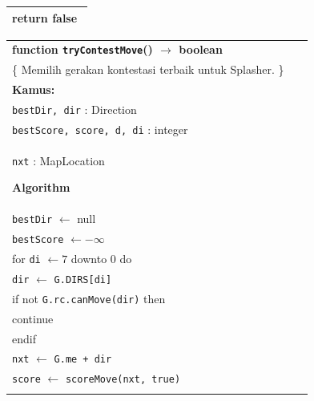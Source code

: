 \documentclass{article}
\newenvironment{pseudobox}
{
\centering
\begin{longtable}{|p{0.94\linewidth}|}
\hline
}
{
\\ \hline
\end{longtable}
\vspace{0.05cm}
}
\begin{document}
\begin{enumerate}[label=\alph*.]
\begin{enumerate}[label=\alph*.]
\begin{pseudobox}
\hspace*{1.5em}return false
\end{pseudobox}

\begin{pseudobox}
\textbf{function \texttt{tryContestMove}() $\rightarrow$ boolean} \\
\{ Memilih gerakan kontestasi terbaik untuk Splasher. \}\\

\textbf{Kamus:} \\
\hspace*{1.5em}\texttt{bestDir, dir} : Direction \\
\hspace*{1.5em}\texttt{bestScore, score, d, di} : integer \\
\hspace*{1.5em}\texttt{nxt} : MapLocation

\textbf{Algorithm} \\
\hspace*{1.5em}\texttt{bestDir} $\leftarrow$ null \\
\hspace*{1.5em}\texttt{bestScore} $\leftarrow -\infty$ \\

\hspace*{1.5em}for \texttt{di} $\leftarrow 7$ downto 0 do \\
\hspace*{3em}\texttt{dir} $\leftarrow$ \texttt{G.DIRS[di]} \\
\hspace*{3em}if not \texttt{G.rc.canMove(dir)} then \\
\hspace*{4.5em}continue \\
\hspace*{3em}endif \\

\hspace*{3em}\texttt{nxt} $\leftarrow$ \texttt{G.me + dir} \\
\hspace*{3em}\texttt{score} $\leftarrow$ \texttt{scoreMove(nxt, true)} \\


\end{pseudobox}
\end{enumerate}
\end{enumerate}
\end{document}
